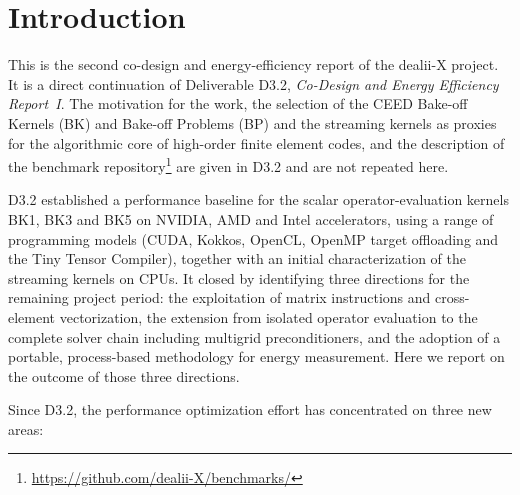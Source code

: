 \documentclass[a4paper,12pt]{article}
\begin{document}
\vspace*{2cm}

\disclaimer

\newpage

\tableofcontents %

\newpage

\section{Introduction}
\label{sec:intro}

This is the second co-design and energy-efficiency report of the dealii-X project.
It is a direct continuation of Deliverable D3.2, \emph{Co-Design and Energy Efficiency Report~I}.
The motivation for the work, the selection of the CEED Bake-off Kernels (BK) and Bake-off Problems (BP) \citep{Fischer20scalability} and the streaming kernels \citep{Chalmers20} as proxies for the algorithmic core of high-order finite element codes, and the description of the benchmark repository\footnote{\url{https://github.com/dealii-X/benchmarks/}} are given in D3.2 and are not repeated here.

D3.2 established a performance baseline for the scalar operator-evaluation kernels BK1, BK3 and BK5 on NVIDIA, AMD and Intel accelerators, using a range of programming models (CUDA, Kokkos, OpenCL, OpenMP target offloading and the Tiny Tensor Compiler), together with an initial characterization of the streaming kernels on CPUs.
It closed by identifying three directions for the remaining project period: the exploitation of matrix instructions and cross-element vectorization, the extension from isolated operator evaluation to the complete solver chain including multigrid preconditioners, and the adoption of a portable, process-based methodology for energy measurement.
Here we report on the outcome of those three directions.

Since D3.2, the performance optimization effort has concentrated on three new areas:
\end{document}

